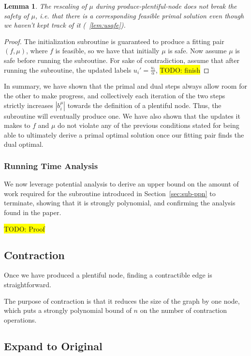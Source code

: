 \documentclass[12pt]{article}
\newtheorem{lemma}[theorem]{Lemma}
\theoremstyle{definition}
\newcommand{\biu}{b_{i}^{\mu}}
\newcommand{\fp}{(f,\mu)}
\newcommand{\todo}[1]{\colorbox{yellow}{TODO: #1}}
\begin{document}
\begin{lemma}
	The rescaling of $\mu$ during produce-plentiful-node does not break 
	the safety of $\mu$, i.e. that there is a corresponding feasible primal
	solution even though we haven't kept track of it (~\ref{lem:usafe}).
\end{lemma}
\begin{proof}
The initialization subroutine is guaranteed to produce a fitting pair $\fp$,
where $f$ is feasible, so we have that initially $\mu$ is safe. Now assume $\mu$
is safe before running the subroutine. For sake of contradiction, assume that
after running the subroutine, the updated labels $u_i' = \frac{u_i}{\alpha}$, 
	\todo{finish}
\end{proof}

In summary, we have shown that the primal and dual steps always allow room for the other to make progress, and collectively each iteration of the two steps strictly increases $|\biu|$ towards
the definition of a plentiful node. Thus, the subroutine will eventually produce one. We have also shown that the updates it makes to $f$ and $\mu$ do not violate any of the previous conditions stated for being able to ultimately derive a primal optimal solution once our fitting pair finds the dual optimal. 

\subsubsection{Running Time Analysis}

We now leverage potential analysis to derive an upper bound on the amount of work required for the subroutine introduced in Section~\ref{sec:sub-ppn} to terminate, showing that it is strongly polynomial, and confirming the analysis found in the paper. 

\todo{Proof}

\subsection{Contraction}

Once we have produced a plentiful node, finding a contractible edge is straightforward. 

The purpose of contraction is that it reduces the size of the graph by one node,
which puts a strongly polynomial bound of $n$ on the number of contraction
operations. 
\subsection{Expand to Original}
\end{document}
